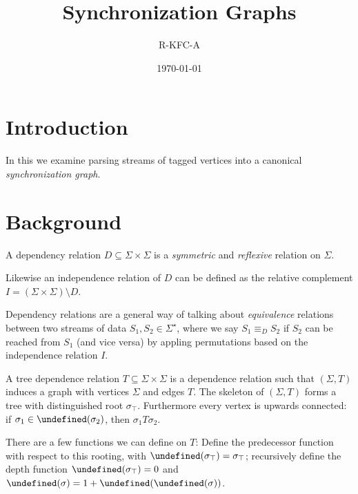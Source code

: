 \documentclass[12pt]{article}
\title{Synchronization Graphs}
\author{R-KFC-A}
\date{\today}
\date{}
\let\pred\undefined
\newcommand{\pred}{\mathbf{pred}}
\let\ancestors\undefined
\newcommand{\ancestors}{\mathbf{ancestors}}
\let\depth\undefined
\newcommand{\depth}{\mathbf{depth}}
\begin{document}
\maketitle

\section{Introduction}

In this we examine parsing streams of tagged vertices
into a canonical \textit{synchronization graph}.


\section{Background}

\begin{definition}
  A dependency relation \(D \subseteq \Sigma \times \Sigma\)
  is a \textit{symmetric} and \textit{reflexive}
  relation on \(\Sigma\).
\end{definition}

Likewise an independence relation of \(D\) can be defined as
the relative complement
\(I = (\Sigma \times \Sigma) \setminus D\).

Dependency relations are a general way of talking about
\textit{equivalence} relations between two streams of data
\(S_1, S_2 \in \Sigma^\star\),
where we say \(S_1 \equiv_D S_2\) if \(S_2\) can be reached from \(S_1\)
(and vice versa) by appling permutations based on
the independence relation \(I\).

\begin{definition}
  A tree dependence relation \(T \subseteq \Sigma \times \Sigma\)
  is a dependence relation such that
  \((\Sigma, T)\) induces a graph with vertices
  \(\Sigma\) and edges \(T\).
  The skeleton of \((\Sigma, T)\) forms a tree
  with distinguished root \(\sigma_\top\).
  Furthermore every vertex is upwards connected:
  if \(\sigma_1 \in \ancestors(\sigma_2)\), then
  \(\sigma_1 T \sigma_2\).
\end{definition}


There are a few functions we can define on \(T\):
Define the predecessor function with respect to this rooting,
with \(\pred(\sigma_\top) = \sigma_\top\);
recursively define the depth function
\(\depth(\sigma_\top) = 0\) and
\(\depth(\sigma) = 1 + \depth(\pred(\sigma))\).
\end{document}
